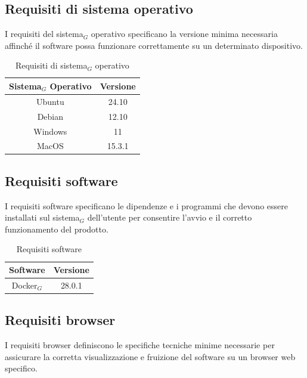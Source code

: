 \documentclass[10pt]{article}
\begin{document}
\begin{justify}
\subsection{Requisiti di sistema operativo}
I requisiti del sistema$_G$ operativo specificano la versione minima necessaria affinché il software possa funzionare correttamente su un determinato dispositivo.

\begin{table}[H]
    \centering
    \begin{tabular}{|c|c|}
        \hline
        \rowcolor{gray!25}
        Sistema$_G$ Operativo & Versione \\
        \hline
        Ubuntu & 24.10\\ 
        \hline
        Debian & 12.10\\
        \hline
        Windows & 11\\
        \hline
        MacOS & 15.3.1\\
        \hline
    \end{tabular}
    \caption{Requisiti di sistema$_G$ operativo}
    \label{tab:requisiti_sistema}
\end{table}

\subsection{Requisiti software}
I requisiti software specificano le dipendenze e i programmi che devono essere installati sul sistema$_G$ dell’utente per consentire l’avvio e il corretto funzionamento del prodotto.

\begin{table}[H]
    \centering
    \begin{tabular}{|c|c|}
        \hline
        \rowcolor{gray!25}
        Software & Versione \\
        \hline
        Docker$_G$ & 28.0.1\\
        \hline
    \end{tabular}
    \caption{Requisiti software}
    \label{tab:requisiti_software}
\end{table}

\subsection{Requisiti browser}
I requisiti browser definiscono le specifiche tecniche minime necessarie per assicurare la corretta visualizzazione e fruizione del software su un browser web specifico.


\end{justify}
\end{document}
